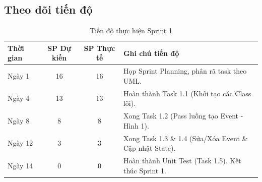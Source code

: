 \subsection{Theo dõi tiến độ}
\begin{table}[H]
    \centering
    \renewcommand{\arraystretch}{1.2}
    \begin{tabular}{|l|c|c|p{7.5cm}|}
        \hline
        \textbf{Thời gian} & \textbf{SP Dự kiến} & \textbf{SP Thực tế} & \textbf{Ghi chú tiến độ} \\ \hline
        Ngày 1 & 16 & 16 & Họp Sprint Planning, phân rã task theo UML. \\ \hline
        Ngày 4 & 13 & 13 & Hoàn thành Task 1.1 (Khởi tạo các Class lõi). \\ \hline
        Ngày 8 & 8 & 8 & Xong Task 1.2 (Pass luồng tạo Event - Hình 1). \\ \hline
        Ngày 12 & 3 & 3 & Xong Task 1.3 \& 1.4 (Sửa/Xóa Event \& Cập nhật State). \\ \hline
        Ngày 14 & 0 & 0 & Hoàn thành Unit Test (Task 1.5). Kết thúc Sprint 1. \\ \hline
    \end{tabular}
    \caption{Tiến độ thực hiện Sprint 1}
\end{table}